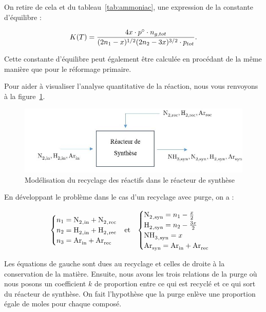 On retire de cela et du tableau~\ref{tab:ammoniac}, une expression de la constante d'équilibre :

$$K(T) = \frac{4x\cdot p^{\circ} \cdot n_{g,tot}}{(2n_1 - x)^{1/2} (2n_2 - 3x)^{3/2} \cdot p_{tot}}.$$

Cette constante d'équilibre peut également être calculée en procédant de la même manière que pour le réformage primaire. 

Pour aider à visualiser l'analyse quantitative de la réaction, nous vous renvoyons à la figure~\ref{fig:purge1}.

\begin{figure}
	\centering
	\includegraphics[scale=0.5]{media/reacteurNH3.jpg}
	\caption{Modélisation du recyclage des réactifs dans le réacteur de synthèse}
	\label{fig:purge1}
\end{figure}

En développant le problème dans le cas d'un recyclage avec purge, on a :

\begin{align}
	\notag
	\begin{cases}
	 n_1 = \ce{N2_{,in} + N2_{,rec}} \\
	 n_2 = \ce{H2_{,in} + H2_{,rec}} \\
	 n_3 = \ce{Ar_{in} + Ar_{rec}} \\
	\end{cases}
	 &  \text{et}  &
	\begin{cases}
	 \ce{N2_{,syn}} = n_1 - \frac{x}{2} \\
	 \ce{H2_{,syn}} = n_2 - \frac{3x}{2} \\
	 \ce{NH3_{,syn}} = x \\
	 \ce{Ar_{syn} = Ar_{in} + Ar_{rec}} \\ 
	\end{cases}
	\\
\end{align}

Les équations de gauche sont dues au recyclage et celles de droite 
à la conservation de la matière. Ensuite, nous avons les trois relations
de la purge où nous posons un coefficient $k$ de proportion entre ce qui
est recyclé et ce qui sort du réacteur de synthèse. On fait l'hypothèse
que la purge enlève une proportion égale de moles pour chaque composé.

